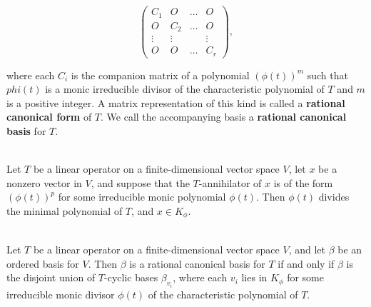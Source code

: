 \begin{definition}
	\[\begin{pmatrix}
			C_1    & O      & \dots & O      \\
			O      & C_2    & \dots & O      \\
			\vdots & \vdots &       & \vdots \\
			O      & O      & \dots & C_r
		\end{pmatrix},\]

	where each $C_i$ is the companion matrix of a polynomial $(\phi(t))^m$ such that $phi(t)$ is a monic irreducible divisor of the characteristic polynomial of $T$ and $m$ is a positive integer. A matrix representation of this kind is called a \textbf{rational canonical form} of $T$. We call the accompanying basis a \textbf{rational canonical basis} for $T$.
\end{definition}

\begin{lemma}
	\hfill\\
	Let $T$ be a linear operator on a finite-dimensional vector space $V$, let $x$ be a nonzero vector in $V$, and suppose that the $T$-annihilator of $x$ is of the form $(\phi(t))^p$ for some irreducible monic polynomial $\phi(t)$. Then $\phi(t)$ divides the minimal polynomial of $T$, and $x \in K_\phi$.
\end{lemma}

\begin{theorem}
	\hfill\\
	Let $T$ be a linear operator on a finite-dimensional vector space $V$, and let $\beta$ be an ordered basis for $V$. Then $\beta$ is a rational canonical basis for $T$ if and only if $\beta$ is the disjoint union of $T$-cyclic bases $\beta_{v_i}$, where each $v_i$ lies in $K_\phi$ for some irreducible monic divisor $\phi(t)$ of the characteristic polynomial of $T$.
\end{theorem}


